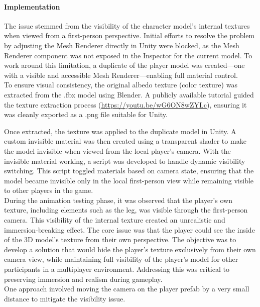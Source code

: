 \documentclass{article}
\begin{document}
\paragraph{Implementation}\hfill

The issue stemmed from the visibility of the character model's internal textures when viewed from a first-person perspective. Initial efforts to resolve the problem by adjusting the Mesh Renderer directly in Unity were blocked, as the Mesh Renderer component was not exposed in the Inspector for the current model. To work around this limitation, a duplicate of the player model was created—one with a visible and accessible Mesh Renderer—enabling full material control.\\

To ensure visual consistency, the original albedo texture (color texture) was extracted from the .fbx model using Blender. A publicly available tutorial guided the texture extraction process (\url{https://youtu.be/wG6ON8wZYLc}), ensuring it was cleanly exported as a .png file suitable for Unity.

Once extracted, the texture was applied to the duplicate model in Unity. A custom invisible material was then created using a transparent shader to make the model invisible when viewed from the local player's camera. With the invisible material working, a script was developed to handle dynamic visibility switching. This script toggled materials based on camera state, ensuring that the model became invisible only in the local first-person view while remaining visible to other players in the game.\\

During the animation testing phase, it was observed that the player's own texture, including elements such as the leg, was visible through the first-person camera. This visibility of the internal texture created an unrealistic and immersion-breaking effect. The core issue was that the player could see the inside of the 3D model's texture from their own perspective. The objective was to develop a solution that would hide the player's texture exclusively from their own camera view, while maintaining full visibility of the player's model for other participants in a multiplayer environment. Addressing this was critical to preserving immersion and realism during gameplay.\\

One approach involved moving the camera on the player prefab by a very small distance to mitigate the visibility issue.\\
\end{document}
